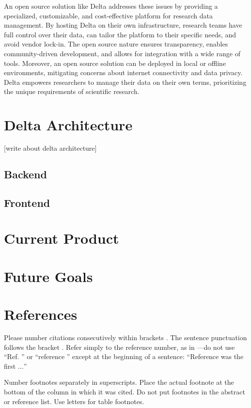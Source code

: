 \documentclass[conference]{IEEEtran}
\begin{document}
An open source solution like Delta addresses these issues by providing a specialized, customizable, and cost-effective platform for research data management. By hosting Delta on their own infrastructure, research teams have full control over their data, can tailor the platform to their specific needs, and avoid vendor lock-in. The open source nature ensures transparency, enables community-driven development, and allows for integration with a wide range of tools. Moreover, an open source solution can be deployed in local or offline environments, mitigating concerns about internet connectivity and data privacy. Delta empowers researchers to manage their data on their own terms, prioritizing the unique requirements of scientific research.

\section{Delta Architecture}
[write about delta architecture]

\subsection{Backend}

\subsection{Frontend}

\section{Current Product}

\section{Future Goals}


\section*{References}

Please number citations consecutively within brackets \cite{b1}. The 
sentence punctuation follows the bracket \cite{b2}. Refer simply to the reference 
number, as in \cite{b3}---do not use ``Ref. \cite{b3}'' or ``reference \cite{b3}'' except at 
the beginning of a sentence: ``Reference \cite{b3} was the first $\ldots$''

Number footnotes separately in superscripts. Place the actual footnote at 
the bottom of the column in which it was cited. Do not put footnotes in the 
abstract or reference list. Use letters for table footnotes.
\end{document}

